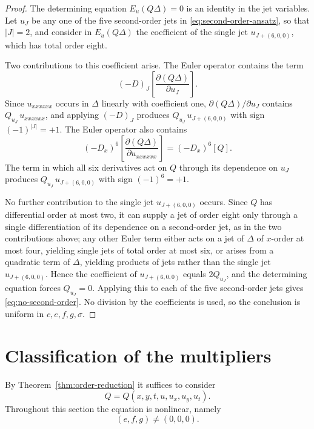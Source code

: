 \documentclass[11pt]{article}
\numberwithin{equation}{section}
\theoremstyle{definition}
\theoremstyle{remark}
\begin{document}
\begin{proof}
The determining equation $E_u(Q\Delta)=0$ is an identity in the jet
variables. Let $u_J$ be any one of the five second-order jets in
\eqref{eq:second-order-ansatz}, so that $|J|=2$, and consider in
$E_u(Q\Delta)$ the coefficient of the single jet $u_{J+(6,0,0)}$,
which has total order eight.

Two contributions to this coefficient arise. The Euler operator
contains the term
\[
(-D)_J\left[
\frac{\partial(Q\Delta)}{\partial u_J}
\right].
\]
Since $u_{xxxxxx}$ occurs in $\Delta$ linearly with coefficient one,
$\partial(Q\Delta)/\partial u_J$ contains $Q_{u_J}\,u_{xxxxxx}$, and
applying $(-D)_J$ produces $Q_{u_J}\,u_{J+(6,0,0)}$ with sign
$(-1)^{|J|}=+1$. The Euler operator also contains
\[
(-D_x)^6\left[
\frac{\partial(Q\Delta)}{\partial u_{xxxxxx}}
\right]
=
(-D_x)^6[Q].
\] The term in which all six derivatives act on $Q$
through its dependence on $u_J$ produces $Q_{u_J}\,u_{J+(6,0,0)}$ with
sign $(-1)^6=+1$.

No further contribution to the single jet $u_{J+(6,0,0)}$ occurs.
Since $Q$ has differential order at most two, it can supply a jet of
order eight only through a single differentiation of its dependence on
a second-order jet, as in the two contributions above; any other
Euler term either acts on a jet of $\Delta$ of $x$-order at most four,
yielding single jets of total order at most six, or arises from a
quadratic term of $\Delta$, yielding products of jets rather than the
single jet $u_{J+(6,0,0)}$. Hence the coefficient of $u_{J+(6,0,0)}$
equals $2Q_{u_J}$, and the determining equation forces $Q_{u_J}=0$.
Applying this to each of the five second-order jets gives
\eqref{eq:no-second-order}. No division by the coefficients is used,
so the conclusion is uniform in $c,e,f,g,\sigma$.
\end{proof}
\section{Classification of the multipliers}
\label{sec:classification}

By Theorem~\ref{thm:order-reduction} it suffices to consider
\begin{equation}
Q = Q(x,y,t,u,u_x,u_y,u_t).
\label{eq:first-order-ansatz}
\end{equation}
Throughout this section the equation is nonlinear, namely
\begin{equation*}
(e,f,g)\neq(0,0,0).
\end{equation*}
\end{document}
